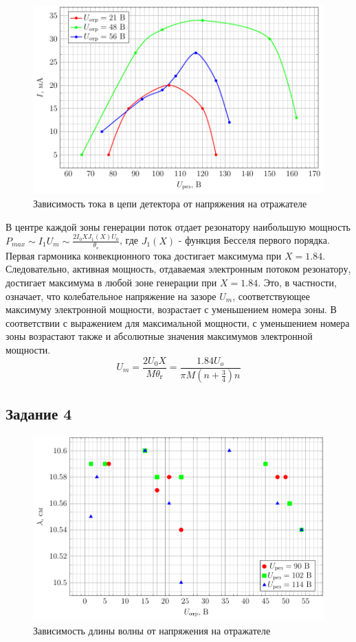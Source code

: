 \begin{figure}[h]
		\centering
		\includegraphics[scale=1]{plots/task3b}
		\caption{Зависимость тока в цепи детектора от напряжения на отражателе}
		\label{fig:task3b}
\end{figure}
В центре каждой зоны генерации поток отдает резонатору наибольшую мощность $\displaystyle P_{max}\sim I_1 U_m \sim \frac{2I_0 XJ_1(X) U_0}{\theta _ { \text{г} }}$, где $J_1(X)$ - функция Бесселя первого порядка. Первая гармоника конвекционного тока достигает максимума при $X=1.84$. Следовательно, активная мощность, отдаваемая электронным потоком резонатору, достигает максимума в любой зоне генерации при $X=1.84$. Это, в частности, означает, что колебательное напряжение на зазоре $U_m$, соответствующее максимуму электронной мощности, возрастает с уменьшением номера зоны. В соответствии с выражением для максимальной мощности, с уменьшением номера зоны возрастают также и абсолютные значения максимумов электронной мощности.
\begin{equation*}
U_m=\frac{2U_0X}{M\theta _ { \text{г} }}=\frac{1.84 U_o}{\pi M(n+\frac 34)n}
\end{equation*}

\subsection{Задание 4}

\begin{figure}[h]
		\centering
		\includegraphics[scale=1]{plots/task4a}
		\caption{Зависимость длины волны от напряжения на отражателе}
		\label{fig:task4a}
\end{figure}

